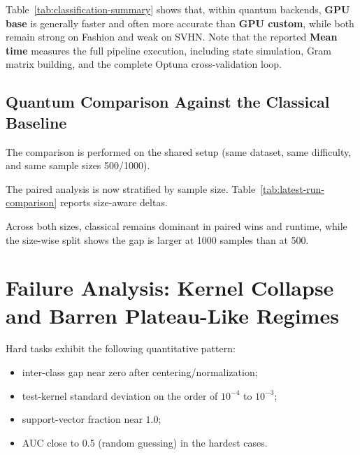 \documentclass[10pt,twocolumn,letterpaper]{article}
\begin{document}
Table~\ref{tab:classification-summary} shows that, within quantum backends, \textbf{GPU base} is generally faster 
and often more accurate than \textbf{GPU custom}, while both remain strong on Fashion and weak on SVHN. Note that 
the reported \textbf{Mean time} measures the full pipeline execution, including state simulation, Gram matrix building, 
and the complete Optuna cross-validation loop.

\subsection{Quantum Comparison Against the Classical Baseline}

The comparison is performed on the shared setup (same dataset, same difficulty, and same sample sizes 500/1000).

The paired analysis is now stratified by sample size. 
Table~\ref{tab:latest-run-comparison} reports size-aware deltas.

\begin{table}[t]
\centering
\caption{Run-scoped paired comparison by sample size. Positive deltas indicate better classical quality; negative time deltas indicate 
faster classical execution.}
\label{tab:latest-run-comparison}
\scriptsize
\setlength{\tabcolsep}{4pt}
\end{table}

Across both sizes, classical remains dominant in paired wins and runtime, while the size-wise split shows the gap is larger at 1000 samples than at 500.

\section{Failure Analysis: Kernel Collapse and Barren Plateau-Like Regimes}
Hard tasks exhibit the following quantitative pattern:
\begin{itemize}
    \item inter-class gap near zero after centering/normalization;
    \item test-kernel standard deviation on the order of $10^{-4}$ to $10^{-3}$;
    \item support-vector fraction near $1.0$;
    \item AUC close to 0.5 (random guessing) in the hardest cases.
\end{itemize}
\end{document}
